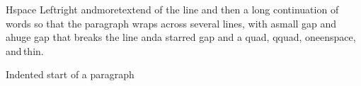 \documentclass[11pt]{beamer}
\begin{document}
\begin{frame}{Hspace}
Left\hspace{2em}right and\hspace{1cm}more\hspace*{3ex}text\hspace{0.1\linewidth}end of the line and then a long continuation of words so that the paragraph wraps across several lines, with a\hspace{5pt}small gap and a\hspace{0.9\textwidth}huge gap that breaks the line and\hspace*{0.9\textwidth}a starred gap and a \quad quad, \qquad qquad, one\enspace enspace, and\,thin.

\hspace{1em}Indented start of a paragraph\hspace{1em}
\end{frame}
\end{document}
